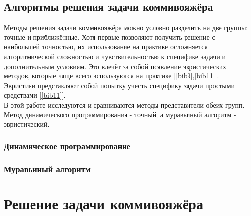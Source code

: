 






\subsection{Алгоритмы решения задачи коммивояжёра}
Методы решения задачи коммивояжёра можно условно разделить на две группы: точные и приближённые. Хотя первые позволяют получить решение с наибольшей точностью, их использование на практике осложняется алгоритмической сложностью и чувствительностью к специфике задачи и дополнительным условиям. Это влечёт за собой появление эвристических методов, которые чаще всего используются на практике [\ref{bib9},\ref{bib11}]. Эвристики представляют собой попытку учесть специфику задачи простыми средствами [\ref{bib11}].\\

В этой работе исследуются и сравниваются методы-представители обеих групп. Метод динамического программирования - точный, а муравьиный алгоритм - эвристический.

\subsubsection{Динамическое программирование}
\subsubsection{Муравьиный алгоритм}
\section{Решение задачи коммивояжёра}
